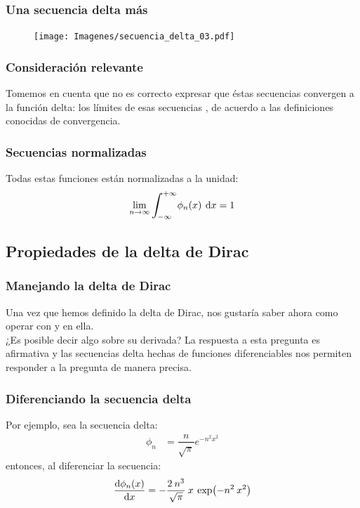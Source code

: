 \documentclass[12pt]{beamer}
\begin{document}
\begin{frame}
\frametitle{Una secuencia delta más}
\begin{figure}[H]
    \centering
    \texttt{[image: Imagenes/secuencia\_delta\_03.pdf]}
    \label{fig:plot_secuencia_03}
\end{figure}
\end{frame}

\begin{frame}
\frametitle{Consideración relevante}
Tomemos en cuenta que no es correcto expresar que éstas secuencias convergen a la función delta: \pause los límites de esas secuencias , de acuerdo a las definiciones conocidas de convergencia.
\end{frame}

\begin{frame}
\frametitle{Secuencias normalizadas}
Todas estas funciones están normalizadas a la unidad:
\pause
\begin{equation}
\lim_{n \to \infty} \scaleint{6ex}_{\bs - \infty}^{+ \infty} \phi_{n} (x) \: \dd{x} = 1
\label{eq:ecuacion_delta_05}
\end{equation}
\end{frame}

\subsection{Propiedades de la delta de Dirac}

\begin{frame}
\frametitle{Manejando la delta de Dirac}
Una vez que hemos definido la delta de Dirac, nos gustaría saber ahora como operar con y en ella. 
\\
\bigskip
\pause
¿Es posible decir algo sobre su derivada? \pause La respuesta a esta pregunta es afirmativa y las secuencias delta hechas de funciones diferenciables nos permiten responder a la pregunta de manera precisa.
\end{frame}

\begin{frame}
\frametitle{Diferenciando la secuencia delta}
Por ejemplo, sea la secuencia delta:
\pause
\begin{align*}
\phi_{n} &= \dfrac{n}{\sqrt{\pi}} e^{-n^{2} x^{2}}
\end{align*}
\pause
entonces, al diferenciar la secuencia:
\pause
\begin{align*}
\dv{\phi_{n}(x)}{x} = - \dfrac{2 \: n^{3}}{\sqrt{\pi}} \: x \: \exp(-n^{2} \: x^{2})
\end{align*}
\end{frame}
\end{document}

